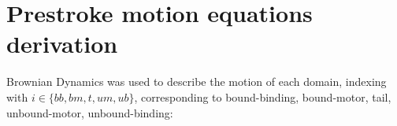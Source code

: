 \documentclass[9pt,twocolumn,twoside]{article}
\begin{document}
%
%

\section*{Prestroke motion equations derivation}
Brownian Dynamics was used to describe the motion of each domain, indexing with $i \in \{bb, bm, t, um, ub\}$, corresponding to bound-binding, bound-motor, tail, unbound-motor, unbound-binding:
\end{document}
